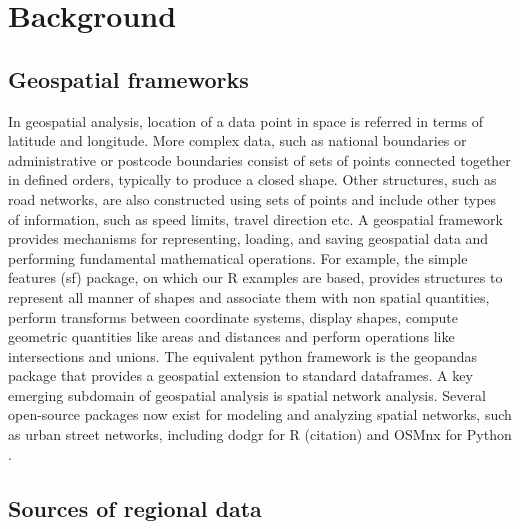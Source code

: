 \documentclass[utf8]{frontiersHLTH}
\begin{document}
\section{Background}\label{background}

\subsection{Geospatial frameworks}\label{geospatial-frameworks}

In geospatial analysis, location of a data point in space is referred
in terms of latitude and longitude. More complex data, such as
national boundaries or administrative or postcode boundaries consist
of sets of points connected together in defined orders, typically to
produce a closed shape. Other structures, such as road networks, are
also constructed using sets of points and include other types of
information, such as speed limits, travel direction etc. A geospatial
framework provides mechanisms for representing, loading, and saving
geospatial data and performing fundamental mathematical
operations. For example, the simple features (sf) \cite{Pebesma_2018}
package, on which our R examples are based, provides structures to
represent all manner of shapes and associate them with non spatial
quantities, perform transforms between coordinate systems, display
shapes, compute geometric quantities like areas and distances and
perform operations like intersections and unions. The equivalent
python framework is the geopandas package that provides a geospatial
extension to standard dataframes. A key emerging subdomain of 
geospatial analysis is spatial network analysis. Several open-source 
packages now exist for modeling and analyzing spatial networks, 
such as urban street networks, including dodgr for R (citation) 
and OSMnx for Python \cite{boeing_osmnx_2017}.

\subsection{Sources of regional data}\label{sources-of-regional-data}
\end{document}
